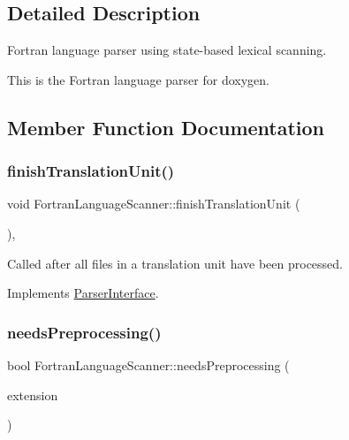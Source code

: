 \subsection{Detailed Description}
Fortran language parser using state-\/based lexical scanning. 

This is the Fortran language parser for doxygen. 

\subsection{Member Function Documentation}
\mbox{\label{class_fortran_language_scanner_abf5a872f1e3bd81f5a285e9586869def}} 
\subsubsection{\texorpdfstring{finishTranslationUnit()}{finishTranslationUnit()}}
{\footnotesize\ttfamily void Fortran\+Language\+Scanner\+::finish\+Translation\+Unit (\begin{DoxyParamCaption}{ }\end{DoxyParamCaption})\hspace{0.3cm}{\ttfamily [inline]}, {\ttfamily [virtual]}}

Called after all files in a translation unit have been processed. 

Implements \mbox{\hyperlink{class_parser_interface_af3acd64c6a33852e2e46e7288eb9c9cf}{Parser\+Interface}}.

\mbox{\label{class_fortran_language_scanner_a94620ec6b6cf583dccd2544671e9e578}} 
\subsubsection{\texorpdfstring{needsPreprocessing()}{needsPreprocessing()}}
{\footnotesize\ttfamily bool Fortran\+Language\+Scanner\+::needs\+Preprocessing (\begin{DoxyParamCaption}\item[{const \mbox{\hyperlink{class_q_c_string}{Q\+C\+String}} \&}]{extension }\end{DoxyParamCaption})\hspace{0.3cm}{\ttfamily [virtual]}}

